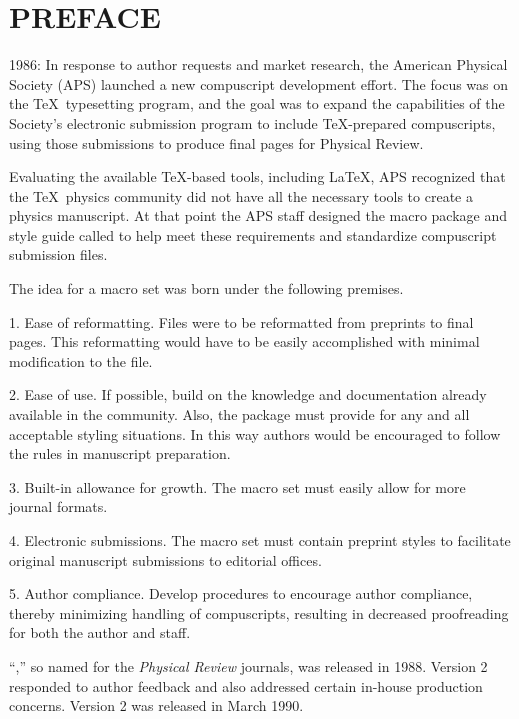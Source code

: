 \newpage

{\rightskip\leftskip

\section*{PREFACE}

      1986: In response to author requests and market research, the
American Physical Society (APS) launched a new compuscript development
effort. The focus was on the \TeX\ typesetting program, and the goal was to
expand the capabilities of the Society's  electronic submission program to
include \TeX-prepared compuscripts, using those submissions to produce
final pages for Physical Review.

      Evaluating the available \TeX-based tools, including LaTeX, APS
recognized that the \TeX\ physics community did not have all the necessary
tools to create a physics manuscript.  At that point the APS staff designed
the macro package and style guide called \REVTeX{} to help meet these
requirements and standardize compuscript submission files.

   The idea for a \REVTeX{} macro set was born under the following premises.

   1. Ease of reformatting.  Files were to be reformatted from preprints to
   final pages.  This reformatting would have to be easily accomplished with
   minimal modification to the file.

   2. Ease of use.  If possible, build on the knowledge and documentation
   already available in the community.  Also, the package must provide for
   any and all acceptable styling situations.  In this way authors would be
   encouraged to follow the rules in manuscript preparation.

   3. Built-in allowance for growth.  The macro set must easily allow for
   more journal formats.

   4. Electronic submissions.  The macro set must contain preprint styles to
   facilitate original manuscript submissions to editorial offices.

   5. Author compliance.  Develop procedures to encourage author compliance,
   thereby minimizing handling of compuscripts, resulting in decreased
   proofreading for both the author and staff.

   ``\REVTeX{},'' so named for the {\em Physical Review} journals, was
     released in 1988.  Version 2 responded to author feedback and
     also addressed certain in-house production concerns.
     Version 2 was released in March 1990.

}
